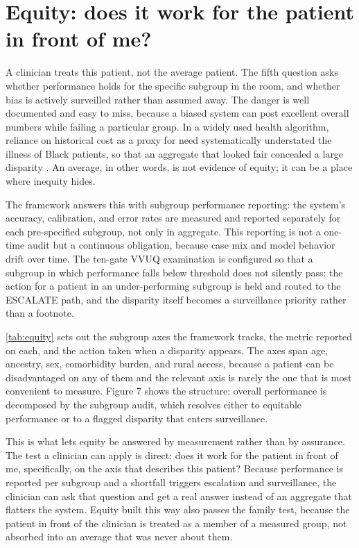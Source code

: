 \section{Equity: does it work for the patient in front of me?}
\label{sec:equity}

A clinician treats this patient, not the average patient. The fifth question asks
whether performance holds for the specific subgroup in the room, and whether bias
is actively surveilled rather than assumed away. The danger is well documented and
easy to miss, because a biased system can post excellent overall numbers while
failing a particular group. In a widely used health algorithm, reliance on
historical cost as a proxy for need systematically understated the illness of Black
patients, so that an aggregate that looked fair concealed a large disparity
\cite{obermeyer2019dissecting}. An average, in other words, is not evidence of
equity; it can be a place where inequity hides.

The framework answers this with subgroup performance reporting: the system's
accuracy, calibration, and error rates are measured and reported separately for
each pre-specified subgroup, not only in aggregate. This reporting is not a
one-time audit but a continuous obligation, because case mix and model behavior
drift over time. The ten-gate VVUQ examination is configured so that a subgroup in
which performance falls below threshold does not silently pass: the action for a
patient in an under-performing subgroup is held and routed to the ESCALATE path,
and the disparity itself becomes a surveillance priority rather than a footnote.

\autoref{tab:equity} sets out the subgroup axes the framework tracks, the metric
reported on each, and the action taken when a disparity appears. The axes span age,
ancestry, sex, comorbidity burden, and rural access, because a patient can be
disadvantaged on any of them and the relevant axis is rarely the one that is most
convenient to measure. Figure 7 shows the structure: overall performance is
decomposed by the subgroup audit, which resolves either to equitable performance or
to a flagged disparity that enters surveillance.

This is what lets equity be answered by measurement rather than by assurance. The
test a clinician can apply is direct: does it work for the patient in front of me,
specifically, on the axis that describes this patient? Because performance is
reported per subgroup and a shortfall triggers escalation and surveillance, the
clinician can ask that question and get a real answer instead of an aggregate that
flatters the system. Equity built this way also passes the family test, because the
patient in front of the clinician is treated as a member of a measured group, not
absorbed into an average that was never about them.

